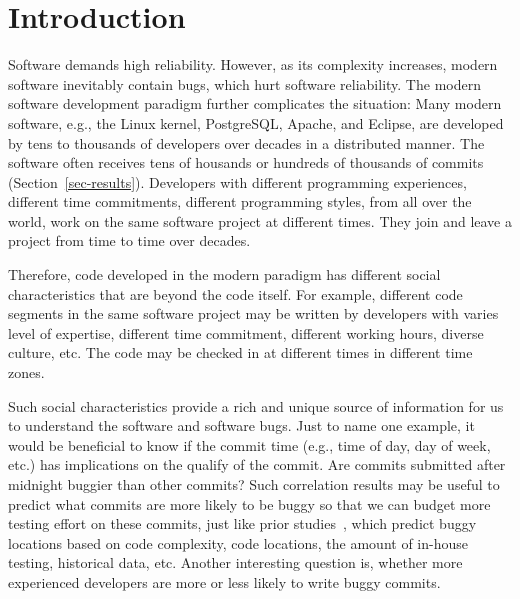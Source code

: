 \section{Introduction}

Software demands high reliability. However, as its complexity increases, 
modern software inevitably contain bugs, which hurt software reliability.
The modern software development paradigm further complicates the situation: 
Many modern software, e.g., the Linux kernel, PostgreSQL, Apache, and Eclipse, 
are developed by tens to thousands of developers over decades %
in a distributed manner. The software often receives tens of housands or hundreds of thousands 
of commits (Section~\ref{sec-results}). 
Developers with different programming experiences, 
different time commitments, different programming styles, from all over the world,
work on the same software project at different times. They join and leave a project 
from time to time over decades.

Therefore, code developed in the modern paradigm has different social characteristics 
that are beyond the code itself. For example, different code segments in the same
software project may be written by developers with  
varies level of expertise, different time 
commitment, different working hours, diverse culture, etc.
The code may be checked in at different times in different time zones. 

Such social characteristics provide a rich and unique source of information for us to 
understand the software and software bugs. Just to name one example, it would be beneficial to know if  
the commit time (e.g., time of day, day of week, etc.) has implications on the qualify of the commit. 
Are commits submitted after midnight buggier than other commits? 
Such correlation results may be useful to predict what commits are more likely
to be buggy so that we can budget more testing effort on these commits, just
like prior studies~\cite{graves00predicting, guo04robust, predictionMenzies10, ostrand05predicting, zimmermann-promise-2007},
which predict buggy locations based on code complexity, 
code locations, the amount of in-house testing, historical data, etc. 
Another interesting question is, whether more experienced developers are more or less
likely to write buggy commits. 


